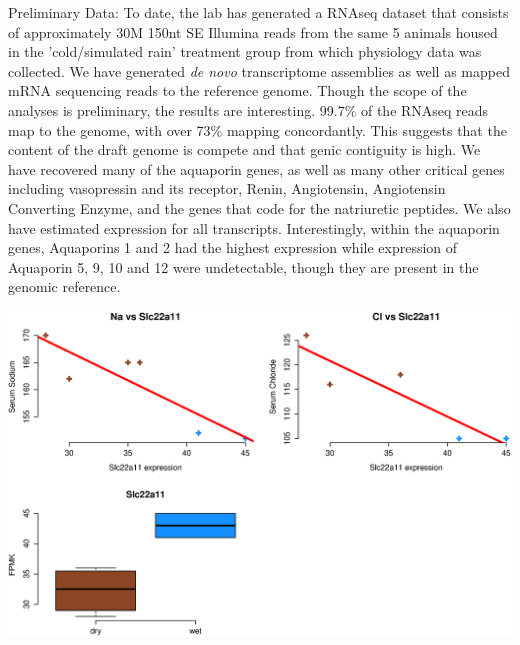 \documentclass[12pt]{article}
\begin{document}


Preliminary Data: To date, the lab has generated a RNAseq dataset that consists of approximately 30M 150nt SE Illumina reads from the same 5 animals housed in the 'cold/simulated rain' treatment group from which physiology data was collected. We have generated \textit{de novo} transcriptome assemblies as well as mapped mRNA sequencing reads to the reference genome. Though the scope of the analyses is preliminary, the results are interesting. 99.7\% of the RNAseq reads map to the genome, with over 73\% mapping concordantly. This suggests that the content of the draft genome is compete and that genic contiguity is high. We have recovered many of the aquaporin genes, as well as many other critical genes including vasopressin and its receptor, Renin, Angiotensin, Angiotensin Converting Enzyme, and the genes that code for the natriuretic peptides. We also have estimated expression for all transcripts.  Interestingly, within the aquaporin genes, Aquaporins 1 and 2 had the highest expression while expression of Aquaporin 5, 9, 10 and 12 were undetectable, though they are present in the genomic reference.  \\

\hypertarget{Table 1}{}
\vspace{-5mm}
\begin{mdframed}
  \begin{center}
    \includegraphics[width=1\textwidth]{slc.eps}
  \end{center}
  \vspace{-5mm}
\end{mdframed}
\end{document}
